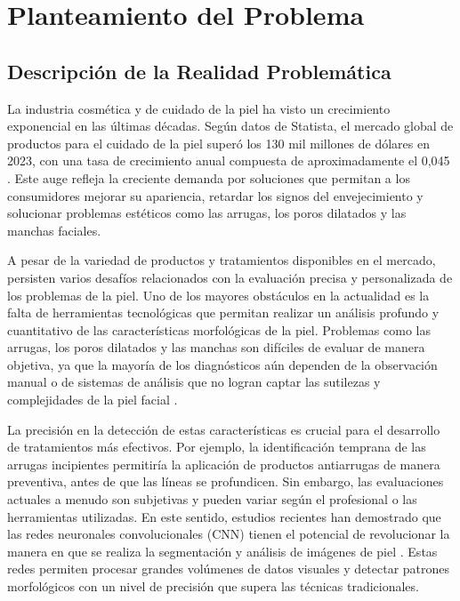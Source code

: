 \chapter{Planteamiento del Problema}
\section{Descripción de la Realidad Problemática}

La industria cosmética y de cuidado de la piel ha visto un crecimiento exponencial en las últimas décadas. Según datos de Statista, el mercado global de productos para el cuidado de la piel superó los 130 mil millones de dólares en 2023, con una tasa de crecimiento anual compuesta de aproximadamente el 0,045 \parencite{statista2023}. Este auge refleja la creciente demanda por soluciones que permitan a los consumidores mejorar su apariencia, retardar los signos del envejecimiento y solucionar problemas estéticos como las arrugas, los poros dilatados y las manchas faciales.

A pesar de la variedad de productos y tratamientos disponibles en el mercado, persisten varios desafíos relacionados con la evaluación precisa y personalizada de los problemas de la piel. Uno de los mayores obstáculos en la actualidad es la falta de herramientas tecnológicas que permitan realizar un análisis profundo y cuantitativo de las características morfológicas de la piel. Problemas como las arrugas, los poros dilatados y las manchas son difíciles de evaluar de manera objetiva, ya que la mayoría de los diagnósticos aún dependen de la observación manual o de sistemas de análisis que no logran captar las sutilezas y complejidades de la piel facial \parencite{phillips2020}.

La precisión en la detección de estas características es crucial para el desarrollo de tratamientos más efectivos. Por ejemplo, la identificación temprana de las arrugas incipientes permitiría la aplicación de productos antiarrugas de manera preventiva, antes de que las líneas se profundicen. Sin embargo, las evaluaciones actuales a menudo son subjetivas y pueden variar según el profesional o las herramientas utilizadas. En este sentido, estudios recientes han demostrado que las redes neuronales convolucionales (CNN) tienen el potencial de revolucionar la manera en que se realiza la segmentación y análisis de imágenes de piel \parencite{esteva2017}. Estas redes permiten procesar grandes volúmenes de datos visuales y detectar patrones morfológicos con un nivel de precisión que supera las técnicas tradicionales.

